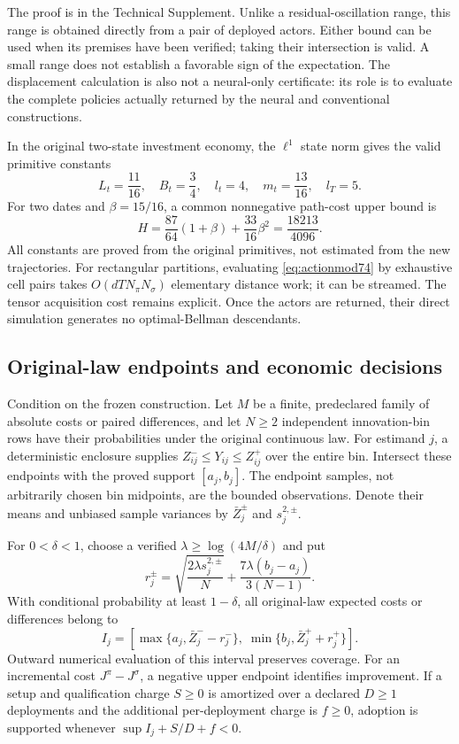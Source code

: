 The proof is in the Technical Supplement. Unlike a residual-oscillation range, this range is obtained directly from a pair of deployed actors. Either bound can be used when its premises have been verified; taking their intersection is valid. A small range does not establish a favorable sign of the expectation. The displacement calculation is also not a neural-only certificate: its role is to evaluate the complete policies actually returned by the neural and conventional constructions.

In the original two-state investment economy, the $\ell^1$ state norm gives the valid primitive constants
\[
 L_t=\frac{11}{16},\quad B_t=\frac34,\quad
 l_t=4,\quad m_t=\frac{13}{16},\quad l_T=5.
\]
For two dates and $\beta=15/16$, a common nonnegative path-cost upper bound is
\begin{equation}\label{eq:globalH74}
 H=\frac{87}{64}(1+\beta)+\frac{33}{16}\beta^2
   =\frac{18213}{4096}.
\end{equation}
All constants are proved from the original primitives, not estimated from the new trajectories. For rectangular partitions, evaluating \eqref{eq:actionmod74} by exhaustive cell pairs takes $O(dT N_\pi N_\sigma)$ elementary distance work; it can be streamed. The tensor acquisition cost remains explicit. Once the actors are returned, their direct simulation generates no optimal-Bellman descendants.

\subsection{Original-law endpoints and economic decisions}
Condition on the frozen construction. Let $M$ be a finite, predeclared family of absolute costs or paired differences, and let $N\ge2$ independent innovation-bin rows have their probabilities under the original continuous law. For estimand $j$, a deterministic enclosure supplies $Z^-_{ij}\le Y_{ij}\le Z^+_{ij}$ over the entire bin. Intersect these endpoints with the proved support $[a_j,b_j]$. The endpoint samples, not arbitrarily chosen bin midpoints, are the bounded observations. Denote their means and unbiased sample variances by $\bar Z_j^\pm$ and $s_j^{2,\pm}$.

\begin{corollary}\label{cor:costinterval74}
For $0<\delta<1$, choose a verified $\lambda\ge\log(4M/\delta)$ and put
\[
 r_j^\pm=\sqrt{\frac{2\lambda s_j^{2,\pm}}{N}}
       +\frac{7\lambda(b_j-a_j)}{3(N-1)}.
\]
With conditional probability at least $1-\delta$, all original-law expected costs or differences belong to
\begin{equation}\label{eq:costinterval74}
 I_j=\left[\max\{a_j,\bar Z_j^- -r_j^-\},\;
           \min\{b_j,\bar Z_j^+ +r_j^+\}\right].
\end{equation}
Outward numerical evaluation of this interval preserves coverage. For an incremental cost $J^\pi-J^\sigma$, a negative upper endpoint identifies improvement. If a setup and qualification charge $S\ge0$ is amortized over a declared $D\ge1$ deployments and the additional per-deployment charge is $f\ge0$, adoption is supported whenever $\sup I_j+S/D+f<0$.
\end{corollary}

